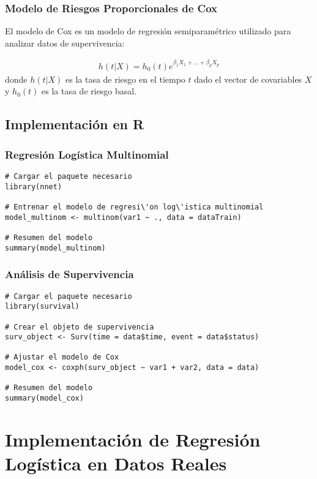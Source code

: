 \documentclass[a4paper]{report} %
\begin{document}
\subsection{Modelo de Riesgos Proporcionales de Cox}

El modelo de Cox es un modelo de regresi\'on semiparam\'etrico utilizado para analizar datos de supervivencia:

\begin{eqnarray*}
h(t|X) = h_0(t) e^{\beta_1 X_1 + \ldots + \beta_p X_p}
\end{eqnarray*}
donde $h(t|X)$ es la tasa de riesgo en el tiempo $t$ dado el vector de covariables $X$ y $h_0(t)$ es la tasa de riesgo basal.

\section{Implementaci\'on en R}

\subsection{Regresi\'on Log\'istica Multinomial}

\begin{verbatim}
# Cargar el paquete necesario
library(nnet)

# Entrenar el modelo de regresi\'on log\'istica multinomial
model_multinom <- multinom(var1 ~ ., data = dataTrain)

# Resumen del modelo
summary(model_multinom)
\end{verbatim}

\subsection{An\'alisis de Supervivencia}

\begin{verbatim}
# Cargar el paquete necesario
library(survival)

# Crear el objeto de supervivencia
surv_object <- Surv(time = data$time, event = data$status)

# Ajustar el modelo de Cox
model_cox <- coxph(surv_object ~ var1 + var2, data = data)

# Resumen del modelo
summary(model_cox)
\end{verbatim}


\chapter{Implementaci\'on de Regresi\'on Log\'istica en Datos Reales}
\end{document}
